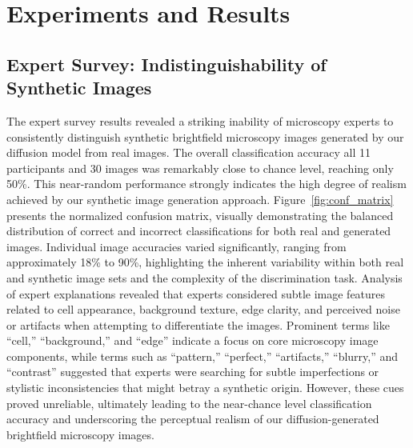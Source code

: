 \section{Experiments and Results}
\label{sec:experiments-and-results}

\subsection{Expert Survey: Indistinguishability of Synthetic Images}
\label{subsec:expert-survey:-indistinguishability-of-synthetic-images}
The expert survey results revealed a striking inability of microscopy experts to consistently distinguish synthetic brightfield microscopy images generated by our diffusion model from real images.
The overall classification accuracy all 11 participants and 30 images was remarkably close to chance level, reaching only 50\%.
This near-random performance strongly indicates the high degree of realism achieved by our synthetic image generation approach.
Figure~\ref{fig:conf_matrix} presents the normalized confusion matrix, visually demonstrating the balanced distribution of correct and incorrect classifications for both real and generated images.
Individual image accuracies varied significantly, ranging from approximately 18\% to 90\%, highlighting the inherent variability within both real and synthetic image sets and the complexity of the discrimination task.
Analysis of expert explanations revealed that experts considered subtle image features related to cell appearance, background texture, edge clarity, and perceived noise or artifacts when attempting to differentiate the images.
Prominent terms like ``cell,'' ``background,'' and ``edge'' indicate a focus on core microscopy image components, while terms such as ``pattern,'' ``perfect,'' ``artifacts,'' ``blurry,'' and ``contrast'' suggested that experts were searching for subtle imperfections or stylistic inconsistencies that might betray a synthetic origin.
However, these cues proved unreliable, ultimately leading to the near-chance level classification accuracy and underscoring the perceptual realism of our diffusion-generated brightfield microscopy images.

